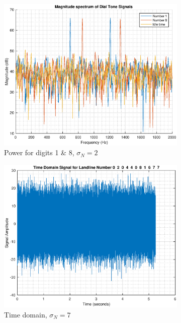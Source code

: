 \documentclass{article}
\begin{document}
\begin{figure}[h!]
\begin{subfigure}{0.32\textwidth}
\centering
\includegraphics[width = \textwidth]{dtp_magspec_n2}
\caption{Power for digits 1 \& 8, $\sigma_N=2$}
\label{fig:dtp_magspec_n2}
\end{subfigure}
\begin{subfigure}{0.32\textwidth}
\centering
\includegraphics[width = \textwidth]{dtp_fullsig_n7}
\caption{Time domain, $\sigma_N=7$}
\label{fig:dtp_fullsig_n7}
\end{subfigure}
\begin{subfigure}{0.32\textwidth}
\centering

\end{subfigure}
\end{figure}
\end{document}
